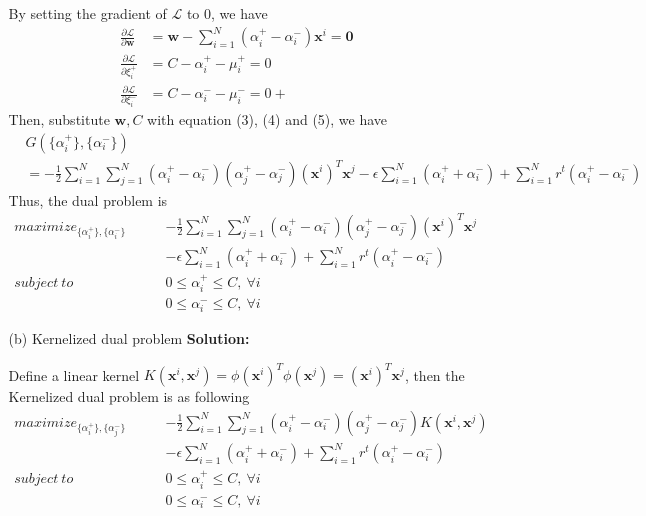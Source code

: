 \documentclass{article}
\renewcommand{\b}[1]{\bm{#1}}
\newcommand{\PARTIAL}[2]{\frac{\partial #1}{\partial #2}}
\begin{document}
\begin{enumerate}
\begin{enumerate}
        By setting the gradient of $\mathcal{L}$ to 0, we have 
        \begin{align}
            \frac{\partial \mathcal{L}}{\partial \b{w}} &= \b{w}-\sum_{i=1}^N(\alpha_i^+-\alpha_i^-)\b{x}^i=\b{0}\\
            \PARTIAL{\mathcal{L}}{\xi_i^+} &= C-\alpha_i^+-\mu_i^+=0\\
            \PARTIAL{\mathcal{L}}{\xi_i^-} &= C-\alpha_i^--\mu_i^-=0+
        \end{align}
        Then, substitute $\b{w}, C$ with equation (3), (4) and (5), we have 
        \begin{align*}
            &G(\{\alpha_i^+\},\{\alpha_i^-\})\\
            &=-\frac{1}{2}\sum_{i=1}^N\sum_{j=1}^N(\alpha_i^+-\alpha_i^-)(\alpha_j^+-\alpha_j^-)(\b{x}^i)^T\b{x}^j-\epsilon\sum_{i=1}^N(\alpha_i^++\alpha_i^-)+\sum_{i=1}^N r^t(\alpha_i^+-\alpha_i^-)
        \end{align*}
        Thus, the dual problem is 
        \begin{align*}
            maximize_{\{\alpha_i^+\},\{\alpha_i^-\}}\qquad &-\frac{1}{2}\sum_{i=1}^N\sum_{j=1}^N(\alpha_i^+-\alpha_i^-)(\alpha_j^+-\alpha_j^-)(\b{x}^i)^T\b{x}^j\\
            &-\epsilon\sum_{i=1}^N(\alpha_i^++\alpha_i^-)+\sum_{i=1}^N r^t(\alpha_i^+-\alpha_i^-)\\
            subject\ to\qquad & 0\leq\alpha_i^+\leq C,\ \forall i\\
            & 0\leq \alpha_i^-\leq C,\ \forall i
        \end{align*}
        \item [(b)] Kernelized dual problem\newline
        {\bf Solution:}
        \par Define a linear kernel $K(\b{x}^i, \b{x}^j)=\phi(\b{x}^i)^T\phi(\b{x}^j)=(\b{x}^i)^T\b{x}^j$, then the Kernelized dual problem is as following
        \begin{align*}
            maximize_{\{\alpha^+_i\},\{\alpha^-_j\}}\qquad &-\frac{1}{2}\sum_{i=1}^N\sum_{j=1}^N(\alpha_i^+-\alpha_i^-)(\alpha_j^+-\alpha_j^-)K(\b{x}^i,\b{x}^j)\\
            &-\epsilon\sum_{i=1}^N(\alpha_i^++\alpha_i^-)+\sum_{i=1}^N r^t(\alpha_i^+-\alpha_i^-)\\
            subject\ to\qquad & 0\leq\alpha_i^+\leq C,\ \forall i\\
            & 0\leq \alpha_i^-\leq C,\ \forall i
        \end{align*}

\end{enumerate}
\end{enumerate}
\end{document}
